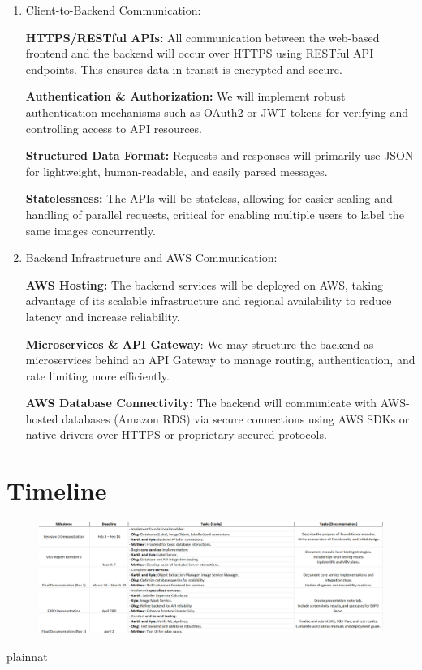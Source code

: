 \documentclass[12pt, titlepage]{article}
\begin{document}
\begin{enumerate}
    \item Client-to-Backend Communication:

        \textbf{HTTPS/RESTful APIs:} All communication between the web-based frontend and the backend will occur over HTTPS using RESTful API endpoints. This ensures data in transit is encrypted and secure.
    
        \textbf{Authentication \& Authorization:} We will implement robust authentication mechanisms such as OAuth2 or JWT tokens for verifying and controlling access to API resources.
    
        \textbf{Structured Data Format:} Requests and responses will primarily use JSON for lightweight, human-readable, and easily parsed messages.
    
        \textbf{Statelessness:} The APIs will be stateless, allowing for easier scaling and handling of parallel requests, critical for enabling multiple users to label the same images concurrently.
        
    \item Backend Infrastructure and AWS Communication:

        \textbf{AWS Hosting:} The backend services will be deployed on AWS, taking advantage of its scalable infrastructure and regional availability to reduce latency and increase reliability.
        
        \textbf{Microservices \& API Gateway}: We may structure the backend as microservices behind an API Gateway to manage routing, authentication, and rate limiting more efficiently.

        \textbf{AWS Database Connectivity:} The backend will communicate with AWS-hosted databases (Amazon RDS) via secure connections using AWS SDKs or native drivers over HTTPS or proprietary secured protocols.
\end{enumerate}


\section{Timeline}

\begin{figure}[H]
  \centering
  \includegraphics[width=1\textwidth]{timeline.png}
  \label{FigUH}
\end{figure}

 {plainnat}


\newpage{}
\end{document}
